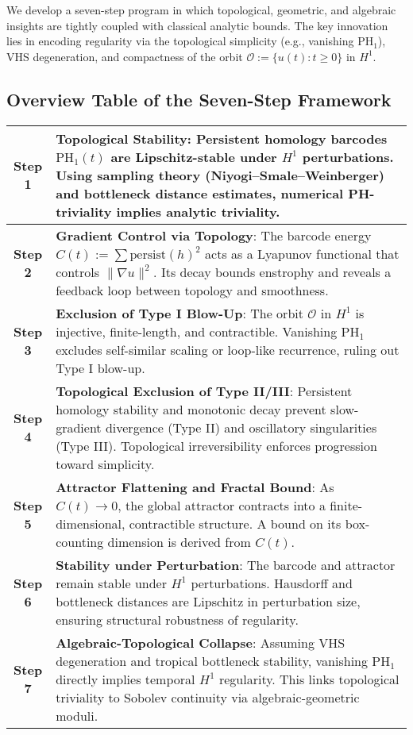\documentclass[11pt]{article}
\theoremstyle{definition}
\begin{document}
We develop a seven-step program in which topological, geometric, and algebraic insights are tightly coupled with classical analytic bounds. The key innovation lies in encoding regularity via the topological simplicity (e.g., vanishing $\mathrm{PH}_1$), VHS degeneration, and compactness of the orbit $\mathcal{O} := \{ u(t) : t \ge 0 \}$ in $H^1$.

\subsection*{Overview Table of the Seven-Step Framework}

\begin{center}
\renewcommand{\arraystretch}{1.4}
\begin{tabular}{|c|p{12.5cm}|}
\hline
\textbf{Step 1} & \textbf{Topological Stability}: Persistent homology barcodes $\mathrm{PH}_1(t)$ are Lipschitz-stable under $H^1$ perturbations. Using sampling theory (Niyogi--Smale--Weinberger) and bottleneck distance estimates, numerical PH-triviality implies analytic triviality. \\
\hline
\textbf{Step 2} & \textbf{Gradient Control via Topology}: The barcode energy $C(t) := \sum \mathrm{persist}(h)^2$ acts as a Lyapunov functional that controls $\|\nabla u\|^2$. Its decay bounds enstrophy and reveals a feedback loop between topology and smoothness. \\
\hline
\textbf{Step 3} & \textbf{Exclusion of Type I Blow-Up}: The orbit $\mathcal{O}$ in $H^1$ is injective, finite-length, and contractible. Vanishing $\mathrm{PH}_1$ excludes self-similar scaling or loop-like recurrence, ruling out Type I blow-up. \\
\hline
\textbf{Step 4} & \textbf{Topological Exclusion of Type II/III}: Persistent homology stability and monotonic decay prevent slow-gradient divergence (Type II) and oscillatory singularities (Type III). Topological irreversibility enforces progression toward simplicity. \\
\hline
\textbf{Step 5} & \textbf{Attractor Flattening and Fractal Bound}: As $C(t) \to 0$, the global attractor contracts into a finite-dimensional, contractible structure. A bound on its box-counting dimension is derived from $C(t)$. \\
\hline
\textbf{Step 6} & \textbf{Stability under Perturbation}: The barcode and attractor remain stable under $H^1$ perturbations. Hausdorff and bottleneck distances are Lipschitz in perturbation size, ensuring structural robustness of regularity. \\
\hline
\textbf{Step 7} & \textbf{Algebraic-Topological Collapse}: Assuming VHS degeneration and tropical bottleneck stability, vanishing $\mathrm{PH}_1$ directly implies temporal $H^1$ regularity. This links topological triviality to Sobolev continuity via algebraic-geometric moduli.
\\
\hline
\end{tabular}
\end{center}
\end{document}

